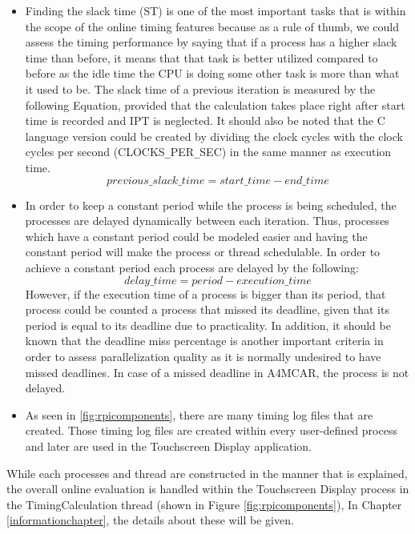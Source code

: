 \begin{itemize}
	\item Finding the slack time (ST) is one of the most important tasks that is within the scope of the online timing features because as a rule of thumb, we could assess the timing performance by saying that if a process has a higher slack time than before, it means that that task is better utilized compared to before as the idle time the CPU is doing some other task is more than what it used to be. The slack time of a previous iteration is measured by the following Equation, provided that the calculation takes place right after start time is recorded and IPT is neglected. It should also be noted that the C language version could be created by dividing the clock cycles with the clock cycles per second (CLOCKS\texttt{\_}PER\texttt{\_}SEC) in the same manner as execution time.
	\begin{equation}
	previous\texttt{\_}slack\texttt{\_}time=start\texttt{\_}time - end\texttt{\_}time
	\end{equation}
	
	\item In order to keep a constant period while the process is being scheduled, the processes are delayed dynamically between each iteration. Thus, processes which have a constant period could be modeled easier and having the constant period will make the process or thread schedulable. In order to achieve a constant period each process are delayed by the following:
	\begin{equation}
	delay\texttt{\_}time=period - execution\texttt{\_}time
	\end{equation}
	However, if the execution time of a process is bigger than its period, that process could be counted a process that missed its deadline, given that its period is equal to its deadline due to practicality. In addition, it should be known that the deadline miss percentage is another important criteria in order to assess parallelization quality as it is normally undesired to have missed deadlines. In case of a missed deadline in A4MCAR, the process is not delayed.
	
	\item As seen in \ref{fig:rpicomponents}, there are many timing log files that are created. Those timing log files are created within every user-defined process and later are used in the Touchscreen Display application.
\end{itemize}

While each processes and thread are constructed in the manner that is explained, the overall online evaluation is handled within the Touchscreen Display process in the TimingCalculation thread (shown in Figure \ref{fig:rpicomponents}),  In Chapter \ref{informationchapter}, the details about these will be given.


